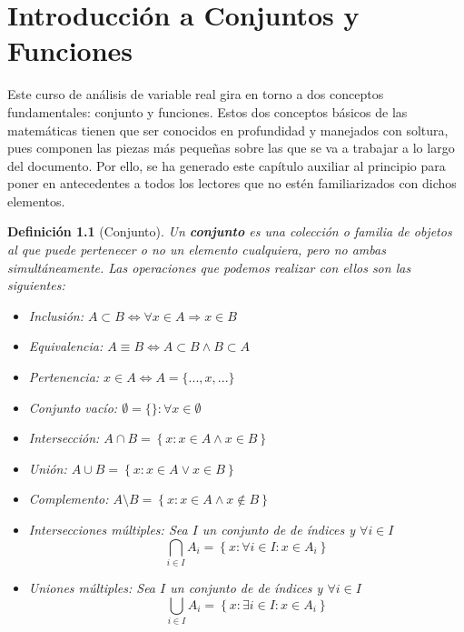 \documentclass[10pt,a4paper,openright]{book}
\theoremstyle{break}
\newtheorem*{defi}{Definición}
\begin{document}
\hypersetup{linkcolor=black}
\setcounter{tocdepth}{3}%
\setcounter{secnumdepth}{4}%
\tableofcontents
\hypersetup{linkcolor=blue}

\mainmatter
\chapter{Introducción a Conjuntos y Funciones}
Este curso de análisis de variable real gira en torno a dos conceptos fundamentales: conjunto y funciones. Estos dos conceptos básicos de las matemáticas tienen que ser conocidos en profundidad y manejados con soltura, pues componen las piezas más pequeñas sobre las que se va  a trabajar a lo largo del documento. Por ello, se ha generado este capítulo auxiliar al principio para poner en antecedentes a todos los lectores que no estén familiarizados con dichos elementos.

\begin{defi}[Conjunto]
Un \textbf{conjunto} es una colección o familia de objetos al que puede pertenecer o no un elemento cualquiera, pero no ambas simultáneamente. Las operaciones que podemos realizar con ellos son las siguientes:
\begin{itemize}
\item Inclusión: $A\subset B \Leftrightarrow \forall x \in A \Rightarrow x \in B$
\item Equivalencia: $A \equiv B \Leftrightarrow A \subset B \wedge B \subset A$
\item Pertenencia: $x \in A \Leftrightarrow A=\{...,x,...\}$
\item Conjunto vacío: $\emptyset=\{\}: \forall x \in \emptyset$
\item Intersección: $A \cap B=\left\lbrace x: x\in A \wedge x\in B \right\rbrace$
\item Unión: $A \cup B=\left\lbrace x: x\in A \vee x\in B \right\rbrace$
\item Complemento: $A \mbox{\textbackslash} B=\left\lbrace x: x\in A \wedge x\notin B \right\rbrace$
\item Intersecciones múltiples: Sea $I$ un conjunto de de índices y $\forall i \in I$
$$\bigcap_{i\in I}A_i=\left\lbrace x: \forall i \in I : x\in A_i\right\rbrace$$
\item Uniones múltiples: Sea $I$ un conjunto de de índices y $\forall i \in I$
$$\bigcup_{i\in I}A_i=\left\lbrace x: \exists i \in I: x\in A_i\right\rbrace$$
\end{itemize}
\end{defi}
\end{document}
